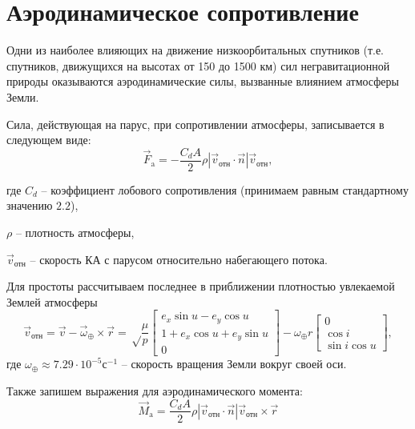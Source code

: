 \section{Аэродинамическое сопротивление}
\noindent\indent Одни из наиболее влияющих на движение низкоорбитальных спутников
(т.е. спутников, движущихся на высотах от 150 до 1500 км) сил негравитационной
природы оказываются аэродинамические силы, вызванные влиянием атмосферы Земли.\par
    Сила, действующая на парус, при сопротивлении атмосферы, записывается в
следующем виде:
\begin{equation}
    \vec{F}_{\text{a}} = -\frac{C_d A}{2}\rho|\vec{v}_{\text{отн}} \cdot \vec{n}| \vec{v}_{\text{отн}},
\end{equation}\par
    где $C_d$ -- коэффициент лобового сопротивления (принимаем равным стандартному
значению $2.2$),\par
    $\rho$ -- плотность атмосферы,\par
    $\vec{v}_{\text{отн}}$ -- скорость КА с парусом относительно набегающего потока.\par
Для простоты рассчитываем последнее в приближении плотностью увлекаемой Землей атмосферы
\begin{equation}
    \vec{v}_{\text{отн}} = \vec{v} - \vec{\omega}_{\oplus} \times \vec{r} =
\sqrt\frac{\mu}{p}\begin{bmatrix}
           e_x\sin u - e_y\cos u \\
           1 + e_x\cos u + e_y\sin u \\
           0
         \end{bmatrix} - \omega_{\oplus}r\begin{bmatrix}
                    0 \\
                    \cos i \\
                    \sin i \cos u
                  \end{bmatrix},
\end{equation}
где $\omega_{\oplus} \approx 7.29\cdot 10^{-5} \text{с}^{-1}$ -- скорость вращения
Земли вокруг своей оси.\par
    Также запишем выражения для аэродинамического момента:
\begin{equation}
    \vec{M}_{\text{a}} = \frac{C_d A}{2}\rho|\vec{v}_{\text{отн}} \cdot \vec{n}| \vec{v}_{\text{отн}}\times\vec{r}
\end{equation}
